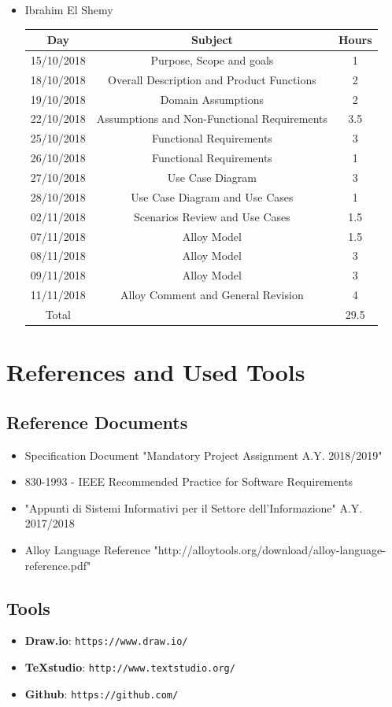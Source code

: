 \documentclass[12pt,a4paper]{article}
\begin{document}
\begin{itemize}
		\item Ibrahim El Shemy
		\begin{center}
			\begin{tabular}{| c | c | c |}
				\hline
				Day & Subject & Hours \\ \hline
				15/10/2018 & Purpose, Scope and goals & 1 \\
				18/10/2018 & Overall Description and Product Functions & 2 \\
				19/10/2018  & Domain Assumptions & 2 \\
				22/10/2018  & Assumptions and Non-Functional Requirements & 3.5 \\
				25/10/2018 & Functional Requirements & 3 \\
				26/10/2018 & Functional Requirements & 1 \\
				27/10/2018 & Use Case Diagram & 3 \\
				28/10/2018 & Use Case Diagram and Use Cases & 1 \\
				02/11/2018 & Scenarios Review and Use Cases & 1.5 \\
				07/11/2018 & Alloy Model & 1.5 \\
				08/11/2018 & Alloy Model & 3 \\
				09/11/2018 & Alloy Model & 3 \\
				11/11/2018 & Alloy Comment and General Revision & 4 \\
				\hline
				Total & & 29.5 \\
				\hline
			\end{tabular}
		\end{center}
	\end{itemize}
	\section{References and Used Tools}
		\subsection{Reference Documents}
			\begin{itemize}
				\item Specification Document "Mandatory Project Assignment A.Y. 2018/2019"
				\item 830-1993 - IEEE Recommended Practice for Software Requirements
				\item "Appunti di Sistemi Informativi per il Settore dell'Informazione" A.Y. 2017/2018
				\item Alloy Language Reference "http://alloytools.org/download/alloy-language-reference.pdf"
			\end{itemize}
		
		\subsection{Tools}
			\begin{itemize}
				\item \textbf{Draw.io}: \texttt{https://www.draw.io/}
				\item \textbf{TeXstudio}: \texttt{http://www.textstudio.org/}
				\item \textbf{Github}: \texttt{https://github.com/}
			\end{itemize}
\end{document}
